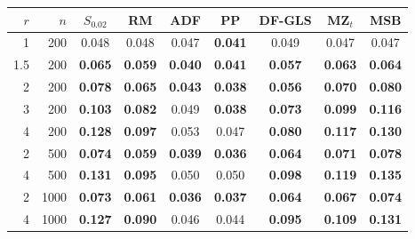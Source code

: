 \begin{tabular}{rrccccccc}
\toprule
$r$ & $n$ & $S_{0.02}$ & RM & ADF & PP & DF-GLS & MZ$_t$ & MSB \\
\midrule
1 & 200 & 0.048 & 0.048 & 0.047 & \textbf{0.041} & 0.049 & 0.047 & 0.047 \\
1.5 & 200 & \textbf{0.065} & \textbf{0.059} & \textbf{0.040} & \textbf{0.041} & \textbf{0.057} & \textbf{0.063} & \textbf{0.064} \\
2 & 200 & \textbf{0.078} & \textbf{0.065} & \textbf{0.043} & \textbf{0.038} & \textbf{0.056} & \textbf{0.070} & \textbf{0.080} \\
3 & 200 & \textbf{0.103} & \textbf{0.082} & 0.049 & \textbf{0.038} & \textbf{0.073} & \textbf{0.099} & \textbf{0.116} \\
4 & 200 & \textbf{0.128} & \textbf{0.097} & 0.053 & 0.047 & \textbf{0.080} & \textbf{0.117} & \textbf{0.130} \\
2 & 500 & \textbf{0.074} & \textbf{0.059} & \textbf{0.039} & \textbf{0.036} & \textbf{0.064} & \textbf{0.071} & \textbf{0.078} \\
4 & 500 & \textbf{0.131} & \textbf{0.095} & 0.050 & 0.050 & \textbf{0.098} & \textbf{0.119} & \textbf{0.135} \\
2 & 1000 & \textbf{0.073} & \textbf{0.061} & \textbf{0.036} & \textbf{0.037} & \textbf{0.064} & \textbf{0.067} & \textbf{0.074} \\
4 & 1000 & \textbf{0.127} & \textbf{0.090} & 0.046 & 0.044 & \textbf{0.095} & \textbf{0.109} & \textbf{0.131} \\
\bottomrule
\end{tabular}
